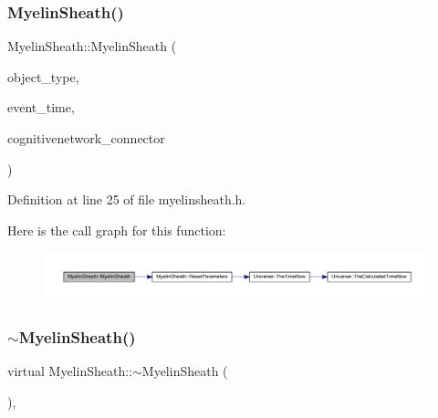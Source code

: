 \subsubsection{\texorpdfstring{Myelin\+Sheath()}{MyelinSheath()}\hspace{0.1cm}{\footnotesize\ttfamily [4/4]}}
{\footnotesize\ttfamily Myelin\+Sheath\+::\+Myelin\+Sheath (\begin{DoxyParamCaption}\item[{unsigned int}]{object\+\_\+type,  }\item[{std\+::chrono\+::time\+\_\+point$<$ \mbox{\hyperlink{universe_8h_a0ef8d951d1ca5ab3cfaf7ab4c7a6fd80}{Clock}} $>$}]{event\+\_\+time,  }\item[{\mbox{\hyperlink{class_cognitive_network}{Cognitive\+Network}} \&}]{cognitivenetwork\+\_\+connector }\end{DoxyParamCaption})\hspace{0.3cm}{\ttfamily [inline]}}



Definition at line 25 of file myelinsheath.\+h.

Here is the call graph for this function\+:\nopagebreak
\begin{figure}[H]
\begin{center}
\leavevmode
\includegraphics[width=350pt]{class_myelin_sheath_aac107d8f22ca3c02f2d346f44950e6d0_cgraph}
\end{center}
\end{figure}
\mbox{\label{class_myelin_sheath_acf71a2a450e2df353f28eed6c7a4129a}} 
\subsubsection{\texorpdfstring{$\sim$\+Myelin\+Sheath()}{~MyelinSheath()}}
{\footnotesize\ttfamily virtual Myelin\+Sheath\+::$\sim$\+Myelin\+Sheath (\begin{DoxyParamCaption}{ }\end{DoxyParamCaption})\hspace{0.3cm}{\ttfamily [inline]}, {\ttfamily [virtual]}}

